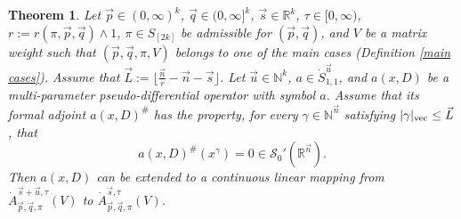 \documentclass[11pt, reqno]{amsart}
\newtheorem{theorem}{Theorem}[section]
\theoremstyle{definition}
\theoremstyle{remark}
\numberwithin{equation}{section}
\newcommand{\N}{\mathbb N}
\newcommand{\R}{\mathbb R}
\newcommand{\vn}{\vec n}
\newcommand{\vp}{\vec p}
\newcommand{\vq}{\vec q}
\newcommand{\vs}{\vec s}
\newcommand{\vu}{\vec u}
\newcommand{\Atau}{\dot A^{\vs,\tau}_{\vp,\vq,\pi}}
\begin{document}
\begin{theorem}\label{pseudo}
Let $\vp\in(0,\infty)^k$, $\vq\in(0,\infty]^k$, $\vs\in\R^k$, $\tau\in[0,\infty)$,
$r:=r(\pi,\vp,\vq)\wedge 1$,
$\pi\in S_{[2k]}$ be admissible for $(\vp,\vq)$,
and $V$ be a matrix weight such that $(\vp,\vq,\pi,V)$ belongs
to one of the main cases (Definition \ref{main cases}).
Assume that $\vec L:=\lfloor \frac{\vec n}r-\vec n-\vec s\rfloor$.
Let $\vu\in\mathbb{N}^k$, $a\in\dot{S}_{1,1}^{\vu}$,
and $a(x,D)$ be a multi-parameter pseudo-differential operator with symbol $a$.
Assume that its formal adjoint $a(x,D)^{\#}$ has the property,
for every $\gamma\in\N^{\vn}$ satisfying $|\gamma|_{\rm{vec}}\leq \vec L$, that
\begin{equation}\label{227}
a(x,D)^{\#}(x^{\gamma})=0
\in \mathscr{S}_0'(\R^{\vec n}).
\end{equation}
Then $a(x,D)$ can be extended to a continuous linear mapping
from $\dot A_{\vp,\vq,\pi}^{\vs+\vu,\tau}(V)$ to $\Atau(V)$.
\end{theorem}
\end{document}
